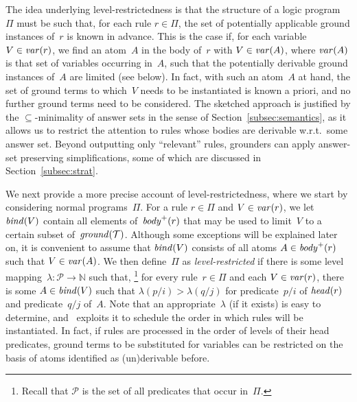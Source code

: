 The idea underlying level-restrictedness is that the structure of a logic program~$\Pi$
must be such that, for each rule $r\in\Pi$,
the set of potentially applicable ground instances of~$r$ is known in advance.
This is the case if, for each variable~$V\in\vars{r}$,
we find an atom~$A$ in the body of~$r$ with
$V\in\vars{A}$, where $\vars{A}$ is that set of variables occurring in~$A$,
such that the potentially derivable ground instances of~$A$ are limited (see below).
In fact, with such an atom~$A$ at hand,
the set of ground terms to which~$V$ needs to be instantiated is known a priori,
and no further ground terms need to be considered.
The sketched approach is justified by the $\subseteq$-minimality of answer sets
in the sense of Section~\ref{subsec:semantics},
as it allows us to restrict the attention to rules whose bodies are derivable w.r.t.\
some answer set.
Beyond outputting only ``relevant'' rules,
grounders can apply answer-set preserving simplifications,
some of which are discussed in Section~\ref{subsec:strat}.

We next provide a more precise account of level-restrictedness,
where we start by considering normal programs~$\Pi$.
For a rule $r\in\Pi$ and $V\in\vars{r}$,
we let $\binders{V}{r}$ contain all elements of~$\pbody{r}$ that may be used to
limit~$V$ to a certain subset of~$\ground{\mathcal{T}}$.
Although some exceptions will be explained later on,
it is convenient to assume that $\binders{V}{r}$ consists of all atoms $A\in\pbody{r}$
such that $V\in\vars{A}$.
We then %
define~$\Pi$ as \emph{level-restricted}
if there is some level mapping~$\lambda:\mathcal{P}\rightarrow\mathbb{N}$ such that,%
\footnote{Recall that $\mathcal{P}$ is the set of all predicates that occur in~$\Pi$.}
for every rule~$r\in\Pi$ and each $V\in\vars{r}$,
there is some $A\in\binders{V}{r}$ such that $\lambda(p/i)>\lambda(q/j)$
for predicate~$p/i$ of $\head{r}$ and predicate~$q/j$ of~$A$.
Note that an appropriate~$\lambda$ (if it exists) is easy to determine,
and \gringo\ exploits it to schedule the order in which rules will be instantiated.
In fact, if rules are processed in the order of levels of their head predicates,
ground  terms to be substituted for variables can be restricted
on the basis of atoms identified as (un)derivable before.


